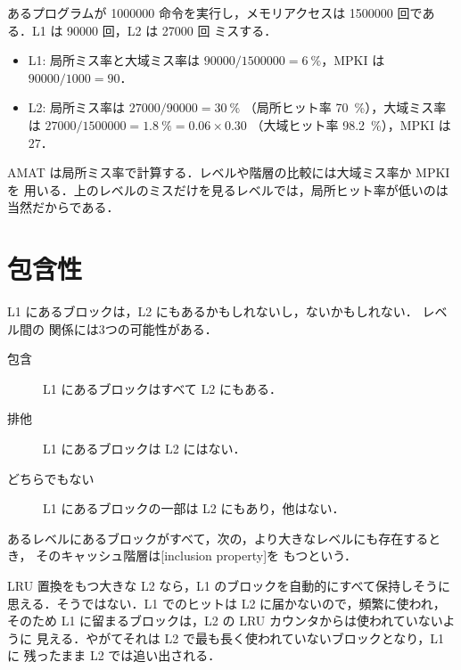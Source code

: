 \documentclass[../main.tex]{subfiles}
\begin{document}
\begin{example}
  \label{ex:l14-local-global}
  あるプログラムが \num{1000000} 命令を実行し，メモリアクセスは
  \num{1500000} 回である．L1 は \num{90000} 回，L2 は \num{27000} 回
  ミスする．
  \begin{itemize}
    \item L1: 局所ミス率と大域ミス率は
      $\num{90000}/\num{1500000} = \SI{6}{\percent}$，MPKI は
      $\num{90000}/1000 = 90$．
    \item L2: 局所ミス率は $\num{27000}/\num{90000} = \SI{30}{\percent}$
      （局所ヒット率 \SI{70}{\percent}），大域ミス率は
      $\num{27000}/\num{1500000} = \SI{1.8}{\percent} = 0.06\times 0.30$
      （大域ヒット率 \SI{98.2}{\percent}），MPKI は $27$．
  \end{itemize}
\end{example}

\begin{keypoint}
  AMAT は局所ミス率で計算する．レベルや階層の比較には大域ミス率か MPKI を
  用いる．上のレベルのミスだけを見るレベルでは，局所ヒット率が低いのは
  当然だからである．
\end{keypoint}

\section{包含性}
\label{sec:l14-inclusion}

L1 にあるブロックは，L2 にもあるかもしれないし，ないかもしれない．
レベル間の
関係には3つの可能性がある．
\begin{description}
  \item[包含] L1 にあるブロックはすべて L2 にもある．
  \item[排他] L1 にあるブロックは L2 にはない．
  \item[どちらでもない] L1 にあるブロックの一部は L2 にもあり，他はない．
\end{description}

\begin{definition}[包含性]
  あるレベルにあるブロックがすべて，次の，より大きなレベルにも存在するとき，
  そのキャッシュ階層は[inclusion property]を
  もつという．
\end{definition}

LRU 置換をもつ大きな L2 なら，L1 のブロックを自動的にすべて保持しそうに
思える．そうではない．L1 でのヒットは L2 に届かないので，頻繁に使われ，
そのため L1 に留まるブロックは，L2 の LRU カウンタからは使われていないように
見える．やがてそれは L2 で最も長く使われていないブロックとなり，L1 に
残ったまま L2 では追い出される．
\end{document}
